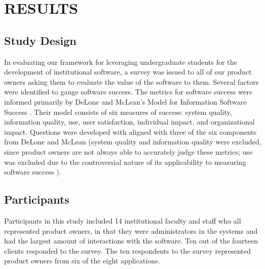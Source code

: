 \section{RESULTS}

\subsection{Study Design}
In evaluating our framework for leveraging undergraduate students for the development of institutional software, a survey was issued to all of our product owners asking them to evaluate the value of the software to them. Several factors were identified to gauge software success. The metrics for software success were informed primarily by DeLone and McLean's Model for Information Software Success \cite{delone1992softwaresuccess}. Their model consists of six measures of success: system quality, information quality, use, user satisfaction, individual impact, and organizational impact. Questions were developed with aligned with three of the six components from DeLone and McLean (system quality and information quality were excluded, since product owners are not always able to accurately judge these metrics; use was excluded due to the controversial nature of its applicability to measuring software success \cite{delone2003delone}). 


\subsection{Participants}
Participants in this study included 14 institutional faculty and staff who all represented product owners, in that they were administrators in the systems and had the largest amount of interactions with the software. Ten out of the fourteen clients responded to the survey. The ten respondents to the survey represented product owners from six of the eight applications.

